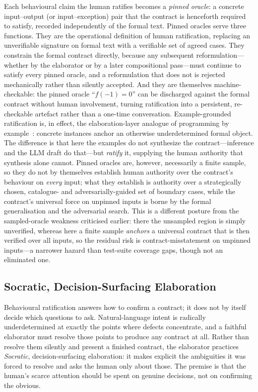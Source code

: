 Each behavioural claim the human ratifies becomes a \emph{pinned oracle}: a concrete input--output (or input--exception) pair that the contract is henceforth required to satisfy, recorded independently of the formal text. Pinned oracles serve three functions. They are the operational definition of human ratification, replacing an unverifiable signature on formal text with a verifiable set of agreed cases. They constrain the formal contract directly, because any subsequent reformulation---whether by the elaborator or by a later compositional pass---must continue to satisfy every pinned oracle, and a reformulation that does not is rejected mechanically rather than silently accepted. And they are themselves machine-checkable: the pinned oracle ``$f(-1)=0$'' can be discharged against the formal contract without human involvement, turning ratification into a persistent, re-checkable artefact rather than a one-time conversation. Example-grounded ratification is, in effect, the elaboration-layer analogue of programming by example~\cite{gulwani2011flashfill}: concrete instances anchor an otherwise underdetermined formal object. The difference is that here the examples do not synthesize the contract---inference and the LLM draft do that---but \emph{ratify} it, supplying the human authority that synthesis alone cannot. Pinned oracles are, however, necessarily a finite sample, so they do not by themselves establish human authority over the contract's behaviour on \emph{every} input; what they establish is authority over a strategically chosen, catalogue- and adversarially-guided set of boundary cases, while the contract's universal force on unpinned inputs is borne by the formal generalisation and the adversarial search. This is a different posture from the sampled-oracle weakness criticised earlier: there the unsampled region is simply unverified, whereas here a finite sample \emph{anchors} a universal contract that is then verified over all inputs, so the residual risk is contract-misstatement on unpinned inputs---a narrower hazard than test-suite coverage gaps, though not an eliminated one.

\subsection{Socratic, Decision-Surfacing Elaboration}
\label{subsec:socratic}

Behavioural ratification answers how to confirm a contract; it does not by itself decide which questions to ask. Natural-language intent is radically underdetermined at exactly the points where defects concentrate, and a faithful elaborator must resolve those points to produce any contract at all. Rather than resolve them silently and present a finished contract, the elaborator practices \emph{Socratic}, decision-surfacing elaboration: it makes explicit the ambiguities it was forced to resolve and asks the human only about those. The premise is that the human's scarce attention should be spent on genuine decisions, not on confirming the obvious.

